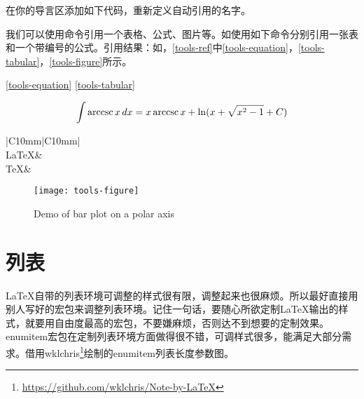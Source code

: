 在你的导言区添加如下代码，重新定义自动引用的名字。
\begin{latex}
\end{latex}

我们可以使用命令引用一个表格、公式、图片等。如使用如下命令分别引用一张表和一个带编号的公式。引用结果：如，\autoref{tools-ref}中\autoref{tools-equation}，\autoref{tools-tabular}，\autoref{tools-figure}所示。

\begin{latex}
\ref{tools-equation}
\ref{tools-tabular}
\end{latex}

\begin{equation}\label{tools-equation}
\int \operatorname{arccsc} x\,dx=x \operatorname{arccsc} x+\ln(x+\sqrt{x^2-1}+C)
\end{equation}

\begin{table}[!ht]
\begin{center}
    \caption{\TeX 家族标识符}
    \label{tools-tabular}
    \begin{tabular}{|C{10mm}|C{10mm}|}
        \hline
        \\
        \hline
        \LaTeX & \LaTeXe\\
        \hline
        \TeX & \XeLaTeX\\
        \hline
    \end{tabular}
\end{center}
\end{table}

\begin{figure}[!htb]
    \begin{center}
        \texttt{[image: tools-figure]}
        \caption{Demo of bar plot on a polar axis}
        \label{tools-figure}
    \end{center}
\end{figure}

\section{列表}
\LaTeX 自带的列表环境可调整的样式很有限，调整起来也很麻烦。所以最好直接用别人写好的宏包来调整列表环境。记住一句话，要随心所欲定制\LaTeX 输出的样式，就要用自由度最高的宏包，不要嫌麻烦，否则达不到想要的定制效果。enumitem宏包在定制列表环境方面做得很不错，可调样式很多，能满足大部分需求。借用wklchris\footnote{\url{https://github.com/wklchris/Note-by-LaTeX}}绘制的enumitem列表长度参数图。


